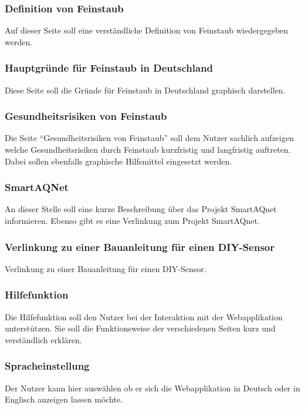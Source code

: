 \subsubsection{Definition von Feinstaub}
Auf dieser Seite soll eine verständliche Definition von \gls{Feinstaub} wiedergegeben werden.


\subsubsection{Hauptgründe für Feinstaub in Deutschland}
Diese Seite soll die Gründe für \gls{Feinstaub} in Deutschland graphisch darstellen.


\subsubsection{Gesundheitsrisiken von Feinstaub}
Die Seite \enquote{Gesundheitsrisiken von \gls{Feinstaub}} soll dem Nutzer sachlich aufzeigen welche Gesundheitsrisiken durch \gls{Feinstaub} kurzfristig und langfristig auftreten. 
Dabei sollen ebenfalls graphische Hilfsmittel eingesetzt werden.

\subsubsection{SmartAQNet}
An dieser Stelle soll eine kurze Beschreibung über das Projekt \gls{SmartAQnet} informieren. 
Ebenso gibt es eine Verlinkung zum Projekt \gls{SmartAQnet}.

\subsubsection{Verlinkung zu einer Bauanleitung für einen DIY-Sensor}
Verlinkung zu einer Bauanleitung für einen \gls{DIY}-\gls{Sensor}.

\subsubsection{Hilfefunktion}
Die Hilfefunktion soll den Nutzer bei der Interaktion mit der Webapplikation unterstützen. Sie soll die Funktionsweise der verschiedenen Seiten kurz und verständlich erklären.

\subsubsection{Spracheinstellung}
Der Nutzer kann hier auswählen ob er sich die Webapplikation in Deutsch oder in Englisch anzeigen lassen möchte.


